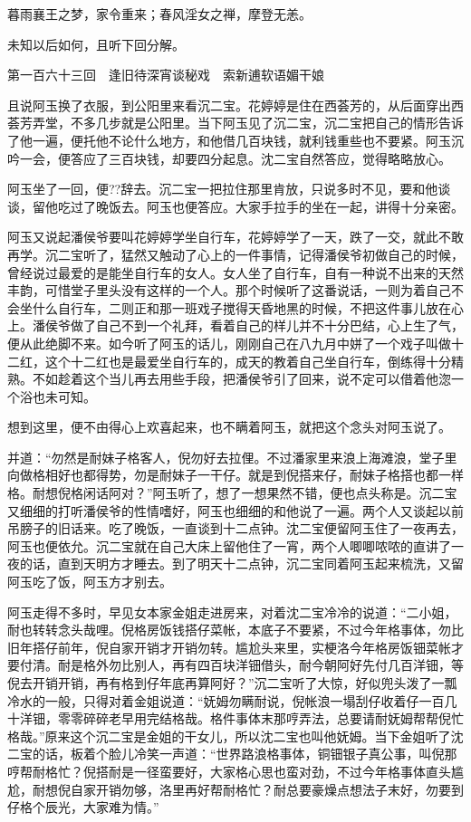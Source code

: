 \documentclass[12pt,UTF8]{ctexbook}
\begin{document}
{{{暮雨襄王之梦，家令重来；春风淫女之禅，摩登无恙。

未知以后如何，且听下回分解。





第一百六十三回　逢旧待深宵谈秘戏　索新逋软语媚干娘





且说阿玉换了衣服，到公阳里来看沉二宝。花婷婷是住在西荟芳的，从后面穿出西荟芳弄堂，不多几步就是公阳里。当下阿玉见了沉二宝，沉二宝把自己的情形告诉了他一遍，便托他不论什么地方，和他借几百块钱，就利钱重些也不要紧。阿玉沉吟一会，便答应了三百块钱，却要四分起息。沈二宝自然答应，觉得略略放心。

阿玉坐了一回，便??辞去。沉二宝一把拉住那里肯放，只说多时不见，要和他谈谈，留他吃过了晚饭去。阿玉也便答应。大家手拉手的坐在一起，讲得十分亲密。

阿玉又说起潘侯爷要叫花婷婷学坐自行车，花婷婷学了一天，跌了一交，就此不敢再学。沉二宝听了，猛然又触动了心上的一件事情，记得潘侯爷初做自己的时候，曾经说过最爱的是能坐自行车的女人。女人坐了自行车，自有一种说不出来的天然丰韵，可惜堂子里头没有这样的一个人。那个时候听了这番说话，一则为着自己不会坐什么自行车，二则正和那一班戏子搅得天昏地黑的时候，不把这件事儿放在心上。潘侯爷做了自己不到一个礼拜，看着自己的样儿并不十分巴结，心上生了气，便从此绝脚不来。如今听了阿玉的话儿，刚刚自己在八九月中姘了一个戏子叫做十二红，这个十二红也是最爱坐自行车的，成天的教着自己坐自行车，倒练得十分精熟。不如趁着这个当儿再去用些手段，把潘侯爷引了回来，说不定可以借着他淴一个浴也未可知。

想到这里，便不由得心上欢喜起来，也不瞒着阿玉，就把这个念头对阿玉说了。

并道：“勿然是耐妹子格客人，倪勿好去拉俚。不过潘家里来浪上海滩浪，堂子里向做格相好也都得势，勿是耐妹子一干仔。就是到倪搭来仔，耐妹子格搭也都一样格。耐想倪格闲话阿对？”阿玉听了，想了一想果然不错，便也点头称是。沉二宝又细细的打听潘侯爷的性情嗜好，阿玉也细细的和他说了一遍。两个人又谈起以前吊膀子的旧话来。吃了晚饭，一直谈到十二点钟。沈二宝便留阿玉住了一夜再去，阿玉也便依允。沉二宝就在自己大床上留他住了一宵，两个人唧唧哝哝的直讲了一夜的话，直到天明方才睡去。到了明天十二点钟，沉二宝同着阿玉起来梳洗，又留阿玉吃了饭，阿玉方才别去。

阿玉走得不多时，早见女本家金姐走进房来，对着沈二宝冷冷的说道：“二小姐，耐也转转念头哉哩。倪格房饭钱搭仔菜帐，本底子不要紧，不过今年格事体，勿比旧年搭仔前年，倪自家开销才开销勿转。尴尬头来里，实梗洛今年格房饭钿菜帐才要付清。耐是格外勿比别人，再有四百块洋钿借头，耐今朝阿好先付几百洋钿，等倪去开销开销，再有格到仔年底再算阿好？”沉二宝听了大惊，好似兜头泼了一瓢冷水的一般，只得对着金姐说道：“妩姆勿瞒耐说，倪帐浪一塌刮仔收着仔一百几十洋钿，零零碎碎老早用完结格哉。格件事体末那哼弄法，总要请耐妩姆帮帮倪忙格哉。”原来这个沉二宝是金姐的干女儿，所以沈二宝也叫他妩姆。当下金姐听了沈二宝的话，板着个脸儿冷笑一声道：“世界路浪格事体，铜钿银子真公事，叫倪那哼帮耐格忙？倪搭耐是一径蛮要好，大家格心思也蛮对劲，不过今年格事体直头尴尬，耐想倪自家开销勿够，洛里再好帮耐格忙？耐总要豪燥点想法子末好，勿要到仔格个辰光，大家难为情。”

}}}
\end{document}
